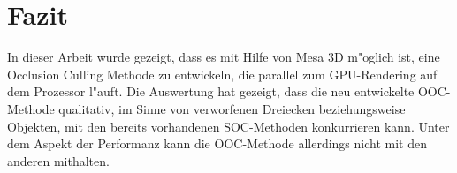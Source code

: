\documentclass[journal]{vgtc}
\begin{document}
%
%
%
%

\section{Fazit}
In dieser Arbeit wurde gezeigt, dass es mit Hilfe von Mesa 3D m"oglich ist, eine Occlusion Culling Methode zu entwickeln, die parallel zum GPU-Rendering auf dem Prozessor l"auft.
Die Auswertung hat gezeigt, dass die neu entwickelte OOC-Methode qualitativ, im Sinne von verworfenen Dreiecken beziehungsweise Objekten, mit den bereits vorhandenen SOC-Methoden konkurrieren kann.
Unter dem Aspekt der Performanz kann die OOC-Methode allerdings nicht mit den anderen mithalten.  \\


\end{document}
